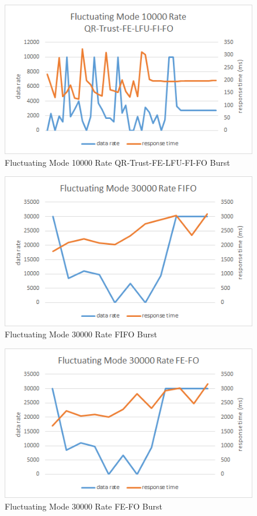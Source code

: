 \begin{figure}[!htbp]
	\centering
	\includegraphics[width=\textwidth]{img/app3-f-10000-qrtrustfelfufifo.png}
	\caption{Fluctuating Mode 10000 Rate QR-Trust-FE-LFU-FI-FO Burst}
\end{figure}
\begin{figure}[!htbp]
	\centering
	\includegraphics[width=\textwidth]{img/app3-f-30000-fifo.png}
	\caption{Fluctuating Mode 30000 Rate FIFO Burst}
\end{figure}
\begin{figure}[!htbp]
	\centering
	\includegraphics[width=\textwidth]{img/app3-f-30000-fefo.png}
	\caption{Fluctuating Mode 30000 Rate FE-FO Burst}
\end{figure}
